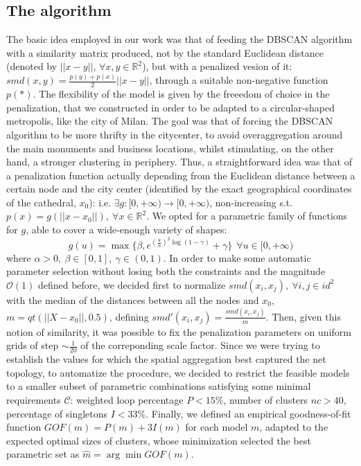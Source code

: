 \documentclass[11pt,twoside]{report}
\begin{document}
\subsection{The algorithm}
The basic idea employed in our work was that of feeding the DBSCAN algorithm with a similarity matrix produced, not by the standard Euclidean distance (denoted by $ ||x-y|| $, $ \forall x, y \in \mathbb{R}^2 $), but with a penalized vesion of it: $ smd(x,y) = \frac{p(y)+p(x)}{2}||x-y|| $, through a suitable non-negative function $ p(*) $. The flexibility of the model is given by the freeedom of choice in the penalization, that we constructed in order to be adapted to a circular-shaped metropolis, like the city of Milan. The goal was that of forcing the DBSCAN algorithm to be more thrifty in the citycenter, to avoid overaggregation around the main monuments and business locations, whilst stimulating, on the other hand, a stronger clustering in periphery. Thus, a straightforward idea was that of a penalization function actually depending from the Euclidean distance between a certain node and the city center (identified by the exact geographical coordinates of the cathedral, $ x_0 $): i.e. $\exists g:[0,+\infty)\rightarrow[0,+\infty)$, non-increasing s.t. $p(x) = g(||x-x_0||),\ \forall x \in \mathbb{R}^2$. We opted for a parametric family of functions for $ g $, able to cover a wide-enough variety of shapes:
\begin{equation}
 g(u) = \max\{\beta, e^{(\frac{u}{\alpha})^2\log{(1-\gamma)}}+\gamma\}\ \ \forall u \in [0,+\infty)
\end{equation}
where $ \alpha>0,\ \beta\in[0,1],\ \gamma \in (0,1) $. In order to make some automatic parameter selection without losing both the constraints and the magnitude $ \mathcal{O}(1) $ defined before, we decided first to normalize $ smd(x_i,x_j),\ \forall i,j \in {id}^2$ with the median of the distances between all the nodes and $ x_0 $, $ m=qt(||X -x_0||,0.5) $, defining $ smd'(x_i,x_j)=\frac{smd(x_i,x_j)}{m} $. Then, given this notion of similarity, it was possible to fix the penalization parameters on uniform grids of step $ \sim \frac{1}{20} $ of the correponding scale factor. Since we were trying to establish the values for which the spatial aggregation best captured the net topology, to automatize the procedure, we decided to restrict the feasible models to a smaller subset of parametric combinations satisfying some minimal requirements $ \mathcal{C} $: weighted loop percentage $ P<15\% $, number of clusters $nc >40 $, percentage of singletons $ I<33\% $. Finally, we defined an empirical goodness-of-fit function $ GOF(m)=P(m)+3I(m) $ for each model $ m $, adapted to the expected optimal sizes of clusters, whose minimization selected the best parametric set as $ \hat{m}=\arg\min GOF(m) $.
\end{document}
